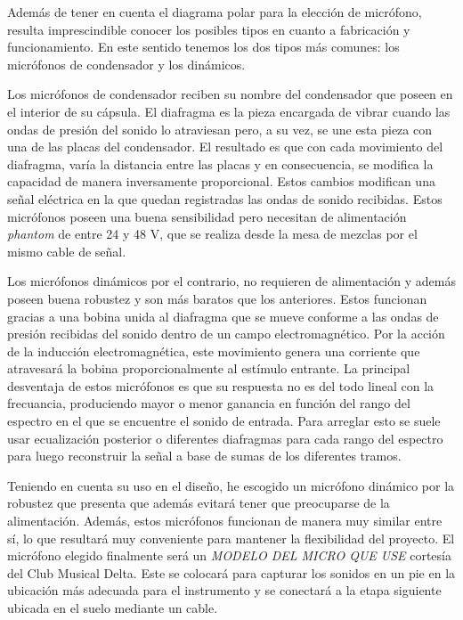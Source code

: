 Además de tener en cuenta el diagrama polar para la elección de micrófono, resulta imprescindible conocer los posibles tipos en cuanto a fabricación y funcionamiento. En este sentido tenemos los dos tipos más comunes: los micrófonos de condensador y los dinámicos.

Los micrófonos de condensador reciben su nombre del condensador que poseen en el interior de su cápsula. El diafragma es la pieza encargada de vibrar cuando las ondas de presión del sonido lo atraviesan pero, a su vez, se une esta pieza con una de las placas del condensador. El resultado es que con cada movimiento del diafragma, varía la distancia entre las placas y en consecuencia, se modifica la capacidad de manera inversamente proporcional. Estos cambios modifican una señal eléctrica en la que quedan registradas las ondas de sonido recibidas. Estos micrófonos poseen una buena sensibilidad pero necesitan de alimentación \emph{phantom} de entre 24 y 48 V, que se realiza desde la mesa de mezclas por el mismo cable de señal.

Los micrófonos dinámicos por el contrario, no requieren de alimentación y además poseen buena robustez y son más baratos que los anteriores. Estos funcionan gracias a una bobina unida al diafragma que se mueve conforme a las ondas de presión recibidas del sonido dentro de un campo electromagnético. Por la acción de la inducción electromagnética, este movimiento genera una corriente que atravesará la bobina proporcionalmente al estímulo entrante. La principal desventaja de estos micrófonos es que su respuesta no es del todo lineal con la frecuancia, produciendo mayor o menor ganancia en función del rango del espectro en el que se encuentre el sonido de entrada. Para arreglar esto se suele usar ecualización posterior o diferentes diafragmas para cada rango del espectro para luego reconstruir la señal a base de sumas de los diferentes tramos.

Teniendo en cuenta su uso en el diseño, he escogido un micrófono dinámico por la robustez que presenta que además evitará tener que preocuparse de la alimentación. Además, estos micrófonos funcionan de manera muy similar entre sí, lo que resultará muy conveniente para mantener la flexibilidad del proyecto. El micrófono elegido finalmente será un \emph{MODELO DEL MICRO QUE USE} cortesía del Club Musical Delta. Este se colocará para capturar los sonidos en un pie en la ubicación más adecuada para el instrumento y se conectará a la etapa siguiente ubicada en el suelo mediante un cable.

